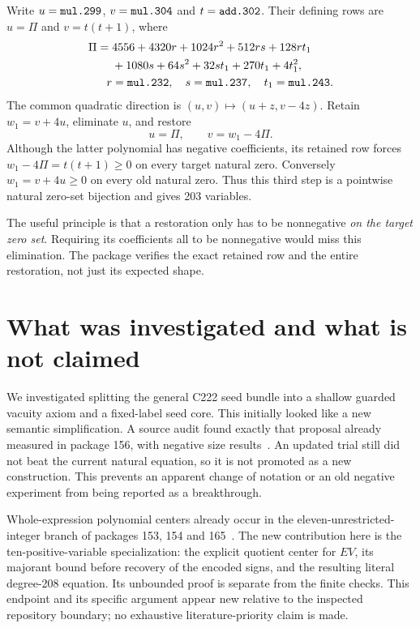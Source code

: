 \documentclass[11pt]{article}
\theoremstyle{remark}\newtheorem{remark}[theorem]{Remark}
\newcommand{\code}[1]{\texttt{\detokenize{#1}}}
\begin{document}
Write $u=\code{mul.299}$, $v=\code{mul.304}$ and
$t=\code{add.302}$. Their defining rows are
$u=\Pi$ and $v=t(t+1)$, where
\begin{align*}
 \Pi={}&4556+4320r+1024r^2+512rs+128rt_1\\
       &{}+1080s+64s^2+32st_1+270t_1+4t_1^2,\\
 r&=\code{mul.232},\quad s=\code{mul.237},\quad
 t_1=\code{mul.243}.
\end{align*}
The common quadratic direction is $(u,v)\mapsto(u+z,v-4z)$.
Retain $w_1=v+4u$, eliminate $u$, and restore
\[
 u=\Pi,\qquad v=w_1-4\Pi.
\]
Although the latter polynomial has negative coefficients, its retained
row forces $w_1-4\Pi=t(t+1)\ge0$ on every target natural zero.
Conversely $w_1=v+4u\ge0$ on every old natural zero. Thus this third
step is a pointwise natural zero-set bijection and gives 203 variables.

The useful principle is that a restoration only has to be nonnegative
\emph{on the target zero set}. Requiring its coefficients all to be
nonnegative would miss this elimination. The package verifies the exact
retained row and the entire restoration, not just its expected shape.

\section{What was investigated and what is not claimed}

We investigated splitting the general C222 seed bundle into a shallow
guarded vacuity axiom and a fixed-label seed core. This initially looked
like a new semantic simplification. A source audit found exactly that
proposal already measured in package 156, with negative size results~\cite{p156}.
An updated trial still did not beat the current natural equation, so it
is not promoted as a new construction. This prevents an apparent change
of notation or an old negative experiment from being reported as a
breakthrough.

Whole-expression polynomial centers already occur in the
eleven-unrestricted-integer branch of packages 153, 154 and
165~\cite{signedcenters}. The new contribution here is the ten-positive-variable
specialization: the explicit quotient center for $EV$, its majorant bound
before recovery of the encoded signs, and the resulting literal degree-208
equation. Its unbounded proof is separate from the finite checks.
This endpoint and its specific argument appear new relative to the inspected
repository boundary; no exhaustive literature-priority claim is made.
\end{document}
